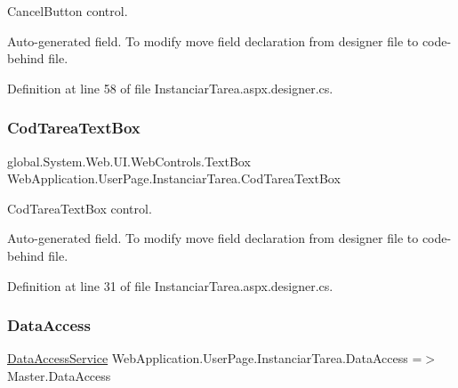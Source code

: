 Cancel\+Button control. 

Auto-\/generated field. To modify move field declaration from designer file to code-\/behind file. 

Definition at line 58 of file Instanciar\+Tarea.\+aspx.\+designer.\+cs.

\mbox{\label{classWebApplication_1_1UserPage_1_1InstanciarTarea_acd42652c937ee0ce36c9bc8800df4bcf}} 
\subsubsection{\texorpdfstring{CodTareaTextBox}{CodTareaTextBox}}
{\footnotesize\ttfamily global.\+System.\+Web.\+U\+I.\+Web\+Controls.\+Text\+Box Web\+Application.\+User\+Page.\+Instanciar\+Tarea.\+Cod\+Tarea\+Text\+Box\hspace{0.3cm}{\ttfamily [protected]}}



Cod\+Tarea\+Text\+Box control. 

Auto-\/generated field. To modify move field declaration from designer file to code-\/behind file. 

Definition at line 31 of file Instanciar\+Tarea.\+aspx.\+designer.\+cs.

\mbox{\label{classWebApplication_1_1UserPage_1_1InstanciarTarea_a0d3588869feea14eebbb8baee638bd99}} 
\subsubsection{\texorpdfstring{DataAccess}{DataAccess}}
{\footnotesize\ttfamily \mbox{\hyperlink{classDataBaseAccess_1_1DataAccessService}{Data\+Access\+Service}} Web\+Application.\+User\+Page.\+Instanciar\+Tarea.\+Data\+Access =$>$ Master.\+Data\+Access\hspace{0.3cm}{\ttfamily [private]}}



